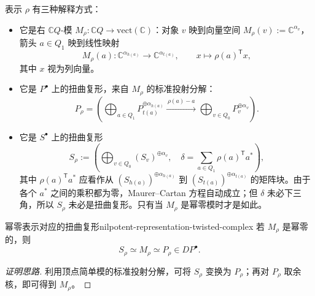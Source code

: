 表示 $\rho$ 有三种解释方式：
\begin{itemize}
  \item 它是右 $\mathbb C Q$-模 $M_\rho\colon\mathbb C Q\to\mathrm{vect}(\mathbb C)$：对象 $v$ 映到向量空间 $M_\rho(v):=\mathbb C^{\alpha_v}$，箭头 $a\in Q_1$ 映到线性映射
  \[
    M_\rho(a)\colon\mathbb C^{\alpha_{h(a)}}\to\mathbb C^{\alpha_{t(a)}},
    \qquad x\longmapsto\rho(a)^\mathsf T x,
  \]
  其中 $x$ 视为列向量。
  \item 它是 $P^\bullet$ 上的扭曲复形，来自 $M_\rho$ 的标准投射分解：
  \[
    P_\rho=\left(
    \bigoplus_{a\in Q_1}P_{t(a)}^{\oplus\alpha_{h(a)}}
    \xrightarrow{\,\rho(a)-a\,}
    \bigoplus_{v\in Q_0}P_v^{\oplus\alpha_v}
    \right).
  \]
  \item 它是 $S^\bullet$ 上的扭曲复形
  \[
    S_\rho:=\left(\bigoplus_{v\in Q_0}(S_v)^{\oplus\alpha_v},
    \quad \delta=\sum_{a\in Q_1}\rho(a)^\mathsf T a^*\right),
  \]
  其中 $\rho(a)^\mathsf T a^*$ 应看作从 $(S_{h(a)})^{\oplus\alpha_{h(a)}}$ 到 $(S_{t(a)})^{\oplus\alpha_{t(a)}}$ 的矩阵块。由于各个 $a^*$ 之间的乘积都为零，Maurer–Cartan 方程自动成立；但 $\delta$ 未必下三角，所以 $S_\rho$ 未必是扭曲复形。只有当 $M_\rho$ 是幂零模时才是如此。
\end{itemize}

\begin{lemma}{幂零表示对应的扭曲复形}{nilpotent-representation-twisted-complex}
若 $M_\rho$ 是幂零的，则
\[
  S_\rho\simeq M_\rho\simeq P_\rho\in DP^\bullet.
\]
\end{lemma}
\begin{proof}[证明思路]
利用顶点简单模的标准投射分解，可将 $S_\rho$ 变换为 $P_\rho$；再对 $P_\rho$ 取余核，即可得到 $M_\rho$。
\end{proof}

